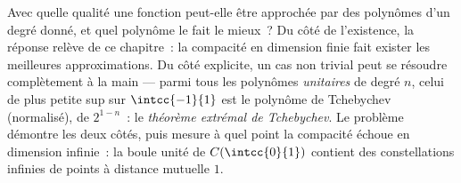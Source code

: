 Avec quelle qualité une fonction peut-elle être approchée par des
polynômes d'un degré donné, et quel polynôme le fait le mieux~? Du
côté de l'existence, la réponse relève de ce chapitre~: la compacité
en dimension finie fait exister les meilleures approximations. Du côté
explicite, un cas non trivial peut se résoudre complètement à la main
--- parmi tous les polynômes \emph{unitaires} de degré $n$, celui de
plus petite  sup sur $\intcc{-1}{1}$ est le polynôme de Tchebychev
(normalisé), de  $2^{1-n}$~: le \emph{théorème extrémal de
Tchebychev}. Le problème démontre les deux côtés, puis mesure à quel
point la compacité échoue en dimension infinie~: la boule unité de
$C(\intcc{0}{1})$ contient des constellations infinies de points à
distance mutuelle $1$.

